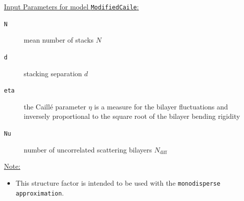 \vspace{5mm}

\noindent
\underline{Input Parameters for model \texttt{ModifiedCaile}:}
\begin{description}
\item[\texttt{N}] mean number of stacks $N$
\item[\texttt{d}] stacking separation $d$
\item[\texttt{eta}]  the Caill\'e parameter $\eta$ is a measure for the bilayer
fluctuations and inversely proportional to the square root of
the bilayer bending rigidity
\item[\texttt{Nu}]   number of uncorrelated scattering bilayers $N_\text{diff}$
\end{description}

\noindent\underline{Note:}
\begin{itemize}
\item This structure factor is intended to be used with the \texttt{monodisperse approximation}.
\end{itemize}


\clearpage
